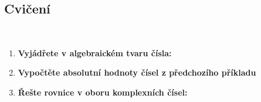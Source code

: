 \begin{mdframed}[style=mdexam]
\subsection{Cvičení}\label{mai:exam081}~ %
  \begin{enumerate}[noitemsep]
    \item \textbf{Vyjádřete v algebraickém tvaru čísla:}%
      \begin{addmargin}[.1\linewidth]{.2\linewidth}%
      \end{addmargin}
   \item \textbf{Vypočtěte absolutní hodnoty čísel z předchozího příkladu}
   \item \textbf{Řešte rovnice v oboru komplexních čísel:}
  \end{enumerate}

\end{mdframed}